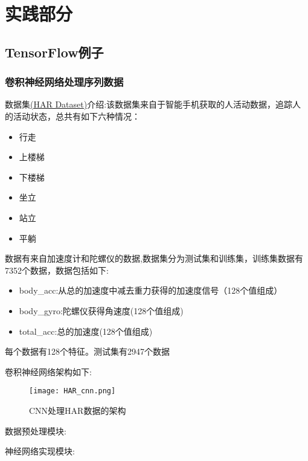 \chapter{实践部分}
\section{TensorFlow例子}
\subsection{卷积神经网络处理序列数据}
数据集\href{https://archive.ics.uci.edu/ml/machine-learning-databases/00240/UCI%20HAR%20Dataset.names}{(HAR Dataset)}介绍:该数据集来自于智能手机获取的人活动数据，追踪人的活动状态，总共有如下六种情况：
\begin{itemize}
\item 行走
\item 上楼梯
\item 下楼梯
\item 坐立
\item 站立
\item 平躺
\end{itemize}
数据有来自加速度计和陀螺仪的数据,数据集分为测试集和训练集，训练集数据有7352个数据，数据包括如下:
\begin{itemize}
	\item body\_acc:从总的加速度中减去重力获得的加速度信号（128个值组成）
	\item body\_gyro:陀螺仪获得角速度(128个值组成)
	\item total\_acc:总的加速度(128个值组成)
\end{itemize}每个数据有128个特征。测试集有2947个数据

卷积神经网络架构如下:
\begin{figure}[H]
\texttt{[image: HAR\_cnn.png]}
\caption{CNN处理HAR数据的架构}
\end{figure}
数据预处理模块:

神经网络实现模块:

